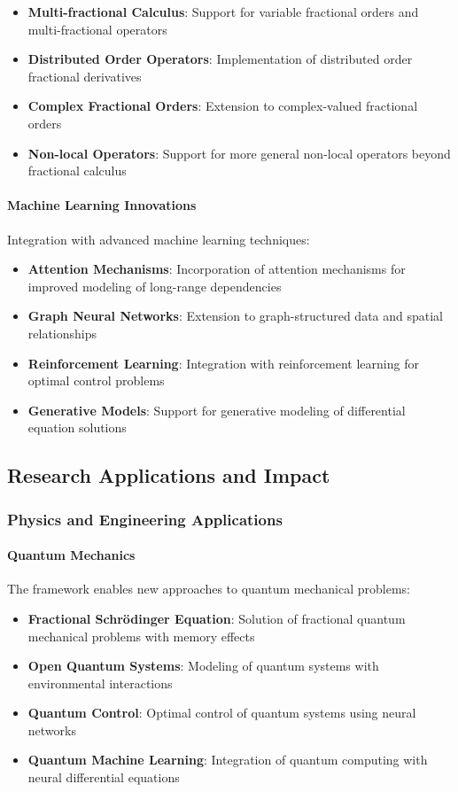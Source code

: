 \begin{itemize}
    \item \textbf{Multi-fractional Calculus}: Support for variable fractional orders and multi-fractional operators
    \item \textbf{Distributed Order Operators}: Implementation of distributed order fractional derivatives
    \item \textbf{Complex Fractional Orders}: Extension to complex-valued fractional orders
    \item \textbf{Non-local Operators}: Support for more general non-local operators beyond fractional calculus
\end{itemize}

\paragraph{Machine Learning Innovations}
Integration with advanced machine learning techniques:

\begin{itemize}
    \item \textbf{Attention Mechanisms}: Incorporation of attention mechanisms for improved modeling of long-range dependencies
    \item \textbf{Graph Neural Networks}: Extension to graph-structured data and spatial relationships
    \item \textbf{Reinforcement Learning}: Integration with reinforcement learning for optimal control problems
    \item \textbf{Generative Models}: Support for generative modeling of differential equation solutions
\end{itemize}

\subsection{Research Applications and Impact}

\subsubsection{Physics and Engineering Applications}

\paragraph{Quantum Mechanics}
The framework enables new approaches to quantum mechanical problems:

\begin{itemize}
    \item \textbf{Fractional Schrödinger Equation}: Solution of fractional quantum mechanical problems with memory effects
    \item \textbf{Open Quantum Systems}: Modeling of quantum systems with environmental interactions
    \item \textbf{Quantum Control}: Optimal control of quantum systems using neural networks
    \item \textbf{Quantum Machine Learning}: Integration of quantum computing with neural differential equations
\end{itemize}


